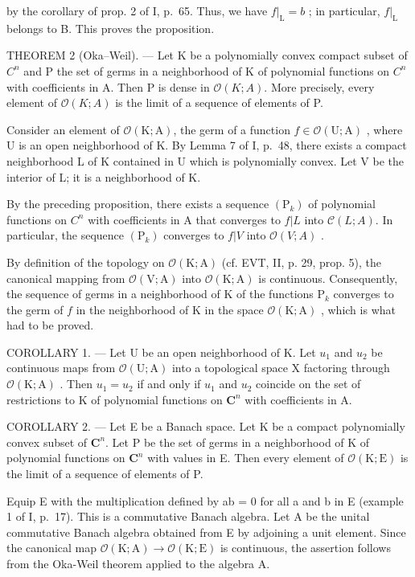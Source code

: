 by the corollary of prop. 2 of I, p.~65. Thus, we have \(f|_{\mathrm{L}} = b\) ; in particular, \(f|_{\mathrm{L}}\) belongs to B. This proves the proposition.

THEOREM 2 (Oka--Weil). --- Let K be a polynomially convex compact subset of \(C^{n}\) and P the set of germs in a neighborhood of K of polynomial functions on \(C^{n}\) with coefficients in A. Then P is dense in \(\mathcal{O}(K;A)\). More precisely, every element of \(\mathcal{O}(K;A)\) is the limit of a sequence of elements of P.

Consider an element of \(\mathcal{O}(\mathrm{K};\mathrm{A})\), the germ of a function \(f\in \mathcal{O}(\mathrm{U};\mathrm{A})\) , where U is an open neighborhood of K. By Lemma 7 of I, p.~48, there exists a compact neighborhood L of K contained in U which is polynomially convex. Let V be the interior of L; it is a neighborhood of K.

By the preceding proposition, there exists a sequence \((\mathrm{P}_{k})\) of polynomial functions on \(C^{n}\) with coefficients in A that converges to \(f|L\) into \(\mathcal{C}(L;A)\). In particular, the sequence \((\mathrm{P}_{k})\) converges to \(f|V\) into \(\mathcal{O}(V;A)\) .

By definition of the topology on \(\mathcal{O}(\mathrm{K};\mathrm{A})\) (cf. EVT, II, p. 29, prop. 5), the canonical mapping from \(\mathcal{O}(\mathrm{V};\mathrm{A})\) into \(\mathcal{O}(\mathrm{K};\mathrm{A})\) is continuous. Consequently, the sequence of germs in a neighborhood of K of the functions \(\mathrm{P}_k\) converges to the germ of \(f\) in the neighborhood of K in the space \(\mathcal{O}(\mathrm{K};\mathrm{A})\) , which is what had to be proved.

COROLLARY 1. --- Let U be an open neighborhood of K. Let \(u_{1}\) and \(u_{2}\) be continuous maps from \(\mathcal{O}(\mathrm{U};\mathrm{A})\) into a topological space X factoring through \(\mathcal{O}(\mathrm{K};\mathrm{A})\) . Then \(u_{1}=u_{2}\) if and only if \(u_{1}\) and \(u_{2}\) coincide on the set of restrictions to K of polynomial functions on \(\mathbf{C}^{n}\) with coefficients in A.

COROLLARY 2. --- Let E be a Banach space. Let K be a compact polynomially convex subset of \(\mathbf{C}^{n}\). Let P be the set of germs in a neighborhood of K of polynomial functions on \(\mathbf{C}^{n}\) with values in E. Then every element of \(\mathcal{O}(\mathrm{K};\mathrm{E})\) is the limit of a sequence of elements of P.

Equip E with the multiplication defined by ab = 0 for all a and b in E (example 1 of I, p.~17). This is a commutative Banach algebra. Let A be the unital commutative Banach algebra obtained from E by adjoining a unit element. Since the canonical map \(\mathcal{O}(\mathrm{K};\mathrm{A}) \to \mathcal{O}(\mathrm{K};\mathrm{E})\) is continuous, the assertion follows from the Oka-Weil theorem applied to the algebra A.

